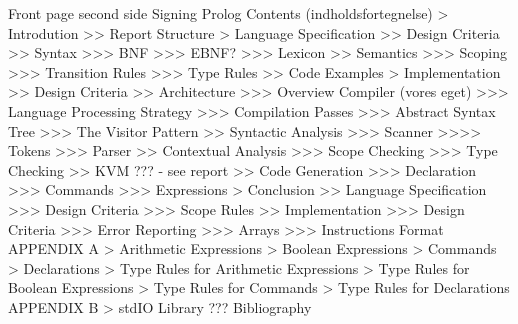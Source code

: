 Front page
second side
Signing
Prolog
Contents (indholdsfortegnelse)
> Introdution
>> Report Structure
> Language Specification
>> Design Criteria
>> Syntax
>>> BNF
>>> EBNF?
>>> Lexicon
>> Semantics
>>> Scoping
>>> Transition Rules
>>> Type Rules
>> Code Examples
> Implementation
>> Design Criteria
>> Architecture
>>> Overview Compiler (vores eget)
>>> Language Processing Strategy
>>> Compilation Passes
>>> Abstract Syntax Tree
>>> The Visitor Pattern
>> Syntactic Analysis
>>> Scanner
>>>> Tokens
>>> Parser
>> Contextual Analysis
>>> Scope Checking
>>> Type Checking
>> KVM ??? - see report
>> Code Generation
>>> Declaration
>>> Commands
>>> Expressions
> Conclusion
>> Language Specification
>>> Design Criteria
>>> Scope Rules
>> Implementation
>>> Design Criteria
>>> Error Reporting
>>> Arrays
>>> Instructions Format
APPENDIX A
> Arithmetic Expressions
> Boolean Expressions
> Commands
> Declarations
> Type Rules for Arithmetic Expressions
> Type Rules for Boolean Expressions
> Type Rules for Commands
> Type Rules for Declarations
APPENDIX B
> stdIO Library ???
Bibliography